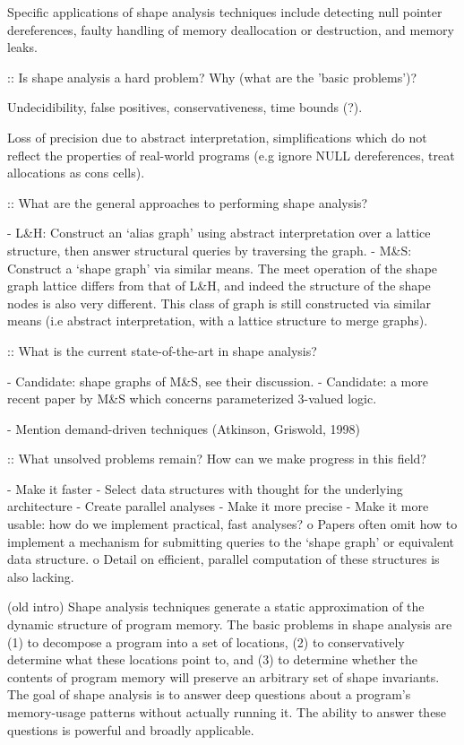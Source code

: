 \documentclass{article}
\begin{document}
Specific applications of shape analysis techniques include detecting null
pointer dereferences, faulty handling of memory deallocation or destruction,
and memory leaks.

:: Is shape analysis a hard problem? Why (what are the 'basic problems')?

Undecidibility, false positives, conservativeness, time bounds (?).

Loss of precision due to abstract interpretation, simplifications which do not
reflect the properties of real-world programs (e.g ignore NULL dereferences,
treat allocations as cons cells).

:: What are the general approaches to performing shape analysis?

- L\&H: Construct an `alias graph' using abstract interpretation over a lattice
  structure, then answer structural queries by traversing the graph.
- M\&S: Construct a `shape graph' via similar means. The meet operation of the
  shape graph lattice differs from that of L\&H, and indeed the structure of the
  shape nodes is also very different. This class of graph is still constructed
  via similar means (i.e abstract interpretation, with a lattice structure to
  merge graphs).

:: What is the current state-of-the-art in shape analysis?

- Candidate: shape graphs of M\&S, see their discussion.
- Candidate: a more recent paper by M\&S which concerns parameterized 3-valued
  logic.

- Mention demand-driven techniques (Atkinson, Griswold, 1998)

:: What unsolved problems remain? How can we make progress in this field?

- Make it faster
    - Select data structures with thought for the underlying architecture
    - Create parallel analyses
- Make it more precise
- Make it more usable: how do we implement practical, fast analyses?
	o Papers often omit how to implement a mechanism for submitting queries
	  to the `shape graph' or equivalent data structure.  
	o Detail on efficient, parallel computation of these structures is also
	  lacking.

      (old intro)
Shape analysis techniques generate a static approximation of the dynamic
structure of program memory. The basic problems in shape analysis are (1) to
decompose a program into a set of locations, (2) to conservatively determine
what these locations point to, and (3) to determine whether the contents of
program memory will preserve an arbitrary set of shape invariants. The goal
of shape analysis is to answer deep questions about a program's memory-usage
patterns without actually running it. The ability to answer these questions
is powerful and broadly applicable.
\end{document}
